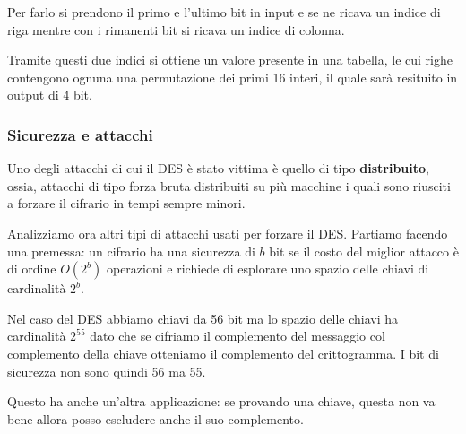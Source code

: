 Per farlo si prendono il primo e l'ultimo bit in input e se ne ricava un indice di riga mentre con i rimanenti bit
si ricava un indice di colonna.

Tramite questi due indici si ottiene un valore presente in una tabella, le cui righe contengono ognuna una permutazione
dei primi 16 interi, il quale sar\`a resituito in output di 4 bit.

\subsubsection{Sicurezza e attacchi}
Uno degli attacchi di cui il DES \`e stato vittima \`e quello di tipo \textbf{distribuito}, ossia, attacchi di tipo
forza bruta distribuiti su pi\`u macchine i quali sono riusciti a forzare il cifrario in tempi sempre minori.

Analizziamo ora altri tipi di attacchi usati per forzare il DES. Partiamo facendo una premessa: un cifrario ha una
sicurezza di $b$ bit se il costo del miglior attacco \`e di ordine $O(2^b)$ operazioni e richiede di esplorare uno
spazio delle chiavi di cardinalit\`a $2^b$.

Nel caso del DES abbiamo chiavi da 56 bit ma lo spazio delle chiavi ha cardinalit\`a $2^{55}$ dato che se cifriamo
il complemento del messaggio col complemento della chiave otteniamo il complemento del crittogramma. I bit di sicurezza
non sono quindi 56 ma 55.

Questo ha anche un'altra applicazione: se provando una chiave, questa non va bene allora posso escludere anche il suo
complemento.